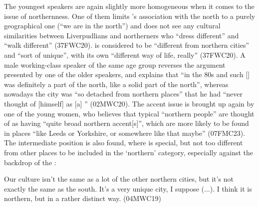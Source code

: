The youngest speakers are again slightly more homogeneous when it comes to the issue of northernness.
One of them limits 's association with the north to a purely geographical one (``we are in the north'') and does not see any cultural similarities between Liverpudlians and northerners who ``dress different'' and ``walk different'' (37FWC20).
 is considered to be ``different from northern cities'' and ``sort of unique'', with its own ``different way of life, really'' (37FWC20).
A male working-class speaker of the same age group reverses the argument presented by one of the older speakers, and explains that ``in the 80s and such [] was definitely a part of the north, like a solid part of the north'', whereas nowadays the city was ``so detached from northern places'' that he had ``never thought of [himself] as [a] '' (02MWC20).
The accent issue is brought up again by one of the young women, who believes that typical ``northern people'' are thought of as having ``quite broad northern accent[s]'', which are more likely to be found in places ``like Leeds or Yorkshire, or somewhere like that maybe'' (07FMC23).
The intermediate position is also found, where  is special, but not too different from other places to be included in the `northern' category, especially against the backdrop of the :
\begin{example}
	Our culture isn't the same as a lot of the other northern cities, but it's not exactly the same as the south.
	It's a very unique city, I suppose (...).
	I think it is northern, but in a rather distinct way. (04MWC19)
\end{example}

